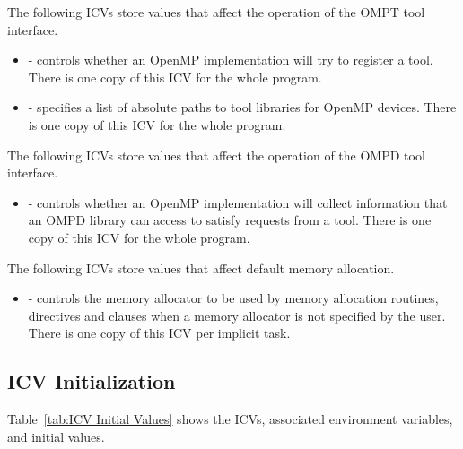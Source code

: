 The following ICVs store values that affect the operation of the OMPT tool interface.

\begin{itemize}

\item {} - controls whether an OpenMP implementation will try to register 
      a tool. There is one copy of this ICV for the whole program.

\item {} - specifies a list of absolute paths to tool libraries 
      for OpenMP devices. There is one copy of this ICV for the whole program.

\end{itemize}

The following ICVs store values that affect the operation of the OMPD tool interface.

\begin{itemize}
\item
   - controls whether an OpenMP implementation will collect
  information that an OMPD library can access to satisfy requests from
  a tool. There is one copy of this ICV for the whole program.
\end{itemize}

The following ICVs store values that affect default memory allocation.

\begin{itemize}

\item {} - controls the memory allocator to be used by 
      memory allocation routines, directives and clauses when a memory allocator 
      is not specified by the user. There is one copy of this ICV per implicit task.

\end{itemize}




\subsection{ICV Initialization}
\label{subsec:ICV Initialization}
Table~\ref{tab:ICV Initial Values} shows the ICVs, associated
environment variables, and initial values.

